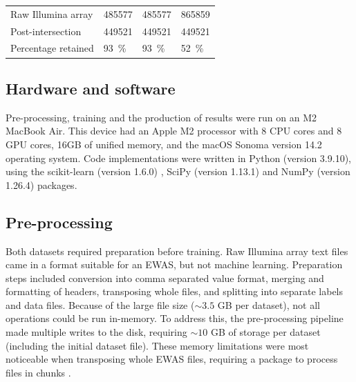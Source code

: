 \documentclass[draft]{article}
\begin{document}
\begin{table}
\begin{tabularx}{\textwidth}{X >{\raggedleft\arraybackslash}X >{\raggedleft\arraybackslash}X >{\raggedleft\arraybackslash}X}
        \midrule
        Raw Illumina array                   & \num{485577}                                  & \num{485577}                                 & \num{865859}                          \\
        Post-intersection                    & \num{449521}                                  & \num{449521}                                 & \num{449521}                          \\
        Percentage retained                  & \SI{93}{\percent}                             & \SI{93}{\percent}                            & \SI{52}{\percent}                     \\
        \bottomrule
    \end{tabularx}
\end{table}

\subsection{Hardware and software}
Pre-processing, training and the production of results were run on an M2 MacBook Air. This device had an Apple M2 processor with 8 CPU cores and 8 GPU cores, 16GB of unified memory, and the macOS Sonoma version 14.2 operating system. Code implementations were written in Python (version 3.9.10), using the scikit-learn (version 1.6.0) \cite{scikit-learn}, SciPy (version 1.13.1) \cite{SciPy} and NumPy (version 1.26.4) \cite{harris2020array} packages.

\subsection{Pre-processing} \label{sec:pre-processing}
Both datasets required preparation before training. Raw Illumina array text files came in a format suitable for an EWAS, but not machine learning. Preparation steps included conversion into comma separated value format, merging and formatting of headers, transposing whole files, and splitting into separate labels and data files. Because of the large file size (\(\sim\!3.5\) GB per dataset), not all operations could be run in-memory. To address this, the pre-processing pipeline made multiple writes to the disk, requiring \(\sim\!10\) GB of storage per dataset (including the initial dataset file). These memory limitations were most noticeable when transposing whole EWAS files, requiring a package to process files in chunks \cite{transposecsv}.
\end{document}
